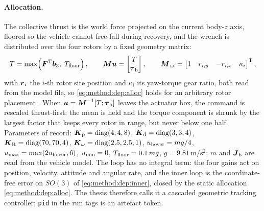 \paragraph{Allocation.} The collective thrust is the world force projected on the current body-$z$
axis, floored so the vehicle cannot free-fall during recovery, and the wrench is distributed over the
four rotors by a fixed geometry matrix:
\begin{equation}\label{eq:method:dep:alloc}
  T = \max\!\left(\boldsymbol{F}^{\textrm{T}}\boldsymbol{b}_{3},\;T_{\textrm{floor}}\right),
  \qquad
  \boldsymbol{M}\boldsymbol{u} = \begin{bmatrix}T\\ \boldsymbol{\tau}_{\textrm{b}}\end{bmatrix},
  \qquad
  \boldsymbol{M}_{:,i} = \begin{bmatrix}1 & r_{i,y} & -r_{i,x} & \kappa_{i}\end{bmatrix}^{\textrm{T}},
\end{equation}
with $\boldsymbol{r}_{i}$ the $i$-th rotor site position and $\kappa_{i}$ its yaw-torque gear ratio, both
read from the model file, so \eqref{eq:method:dep:alloc} holds for an arbitrary rotor placement
\parencite[Eq.~(1)]{lee2010geometric}\parencite{mellinger2011minimum}. When
$\boldsymbol{u} = \boldsymbol{M}^{-1}[T;\boldsymbol{\tau}_{\textrm{b}}]$ leaves the actuator box, the command is rescaled
thrust-first: the mean is held and the torque component is shrunk by the largest factor that keeps
every rotor in range, but never below one half. Parameters of record:
$\boldsymbol{K}_{\textrm{p}} = \operatorname{diag}(4,4,8)$, $\boldsymbol{K}_{\textrm{d}} = \operatorname{diag}(3,3,4)$,
$\boldsymbol{K}_{\textrm{R}} = \operatorname{diag}(70,70,4)$, $\boldsymbol{K}_{\omega} = \operatorname{diag}(2.5,2.5,1)$,
$u_{\textrm{hover}} = mg/4$, $u_{\textrm{max}} = \max(2u_{\textrm{hover}},6)$, $u_{\textrm{min}} = 0$,
$T_{\textrm{floor}} = 0.1\,mg$, $g = 9.81\,\textrm{m}/\textrm{s}^{2}$; $m$ and $\boldsymbol{J}_{\textrm{b}}$ are
read from the vehicle model.
The loop has no integral term: the four gains act on position, velocity, attitude and angular rate,
and the inner loop is the coordinate-free error on $SO(3)$ of \eqref{eq:method:dep:inner}, closed by
the static allocation \eqref{eq:method:dep:alloc}. The thesis therefore calls it a cascaded geometric
tracking controller; \texttt{pid} in the run tags is an artefact token.

